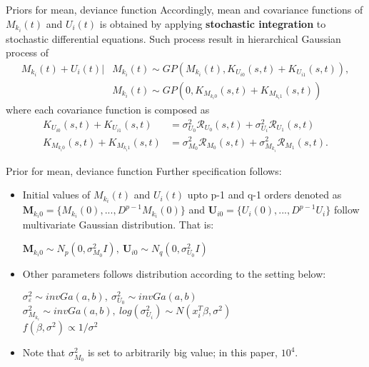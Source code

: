 \documentclass[10pt]{beamer}
\def\mean{M_{k_i}(t)}
\def\dev{U_i(t)}
\begin{document}
\begin{frame}[t]{Priors for mean, deviance function}
\vspace{4pt}
Accordingly, mean and covariance functions of $\mean$ and $\dev$ is obtained by applying \textbf{stochastic integration} to stochastic differential equations. Such process result in hierarchical Gaussian process of
\begin{align*}
\mean +\dev | & \mean \sim GP(\mean , K_{U_{i0}}(s,t)+K_{U_{i1}}(s,t)),\\
	& \mean \sim GP(0 , K_{M_{k_{i}0}}(s,t)+K_{M_{k_{i}1}}(s,t))
\end{align*}
where each covariance function is composed as
\begin{align*}
K_{U_{i0}}(s,t)+K_{U_{i1}}(s,t)& =\sigma^{2}_{U_0}\mathcal{R}_{U_0}(s,t)+\sigma^{2}_{U_i}\mathcal{R}_{U_1}(s,t)\\
K_{M_{k_{i}0}}(s,t)+K_{M_{k_{i}1}}(s,t)& =\sigma^{2}_{M_0}\mathcal{R}_{M_0}(s,t)+\sigma^{2}_{M_{k_i}}\mathcal{R}_{M_1}(s,t).
\end{align*}
\end{frame}

\begin{frame}[t]{Prior for mean, deviance function}
\vspace{4pt}
Further specification follows:\\
\begin{itemize}
\item 
Initial values of $\mean$ and $\dev$ upto p-1 and q-1 orders denoted as $\textbf{M}_{{k_i}0}=\{M_{k_i}(0),...,D^{p-1}M_{k_i}(0)\}$ and $\textbf{U}_{i0}=\{U_i(0),...,D^{p-1}U_i\}$ follow multivariate Gaussian distribution. That is:
\begin{center}
$\textbf{M}_{{k_i}0}\sim N_p(0,\sigma^2_{M_0}\mathit{I}),\ \textbf{U}_{i0}\sim N_q(0, \sigma^2_{U_0}I)$
\end{center}
\item Other parameters follows distribution according to the setting below:\\
\begin{center}
$\sigma_{\varepsilon}^2\sim invGa(a,b),\ \sigma_{U_0}^2\sim invGa(a,b)$\\
$\sigma_{M_{k_i}}^2\sim invGa(a,b),\ log(\sigma_{U_i}^2)\sim N(x_i^T\beta, \sigma^2)$\\
$f(\beta, \sigma^2)\propto 1/\sigma^2$
\end{center}
\item Note that $\sigma_{M_0}^2$ is set to arbitrarily big value; in this paper, $10^4$.
\end{itemize}
\end{frame}
\end{document}
